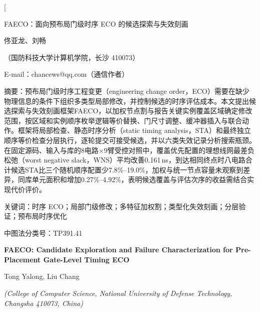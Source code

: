 \documentclass[twocolumn,10pt,fontset=windows]{ctexart}
\let\songti\songfamily\let\heiti\heifamily\let\fangsong\fangfamily
\begin{document}
\pagestyle{plain}

\twocolumn[
\vspace*{-0.25cm}
\begin{center}
{\heiti{} FAECO：面向预布局门级时序 ECO 的候选探索与失效刻画}\par
\vspace{6pt}
{\fangsong{} 佟亚龙、刘畅}\par
\vspace{4pt}
{\songti\fontsize{8}{12}\selectfont（国防科技大学计算机学院，长沙 410073）}\par\vspace{2pt}
{\songti\fontsize{8}{12}\selectfont E-mail：chancews@qq.com（通信作者）}\par
\vspace{6pt}
\end{center}
\begin{flushleft}
  {\heiti\fontsize{8.5}{13}\selectfont 摘\quad 要：}{\songti\fontsize{8.5}{13}\selectfont 预布局门级时序工程变更（engineering change order，ECO）需要在缺少物理信息的条件下组织多类型局部修改，并控制候选的时序评估成本。本文提出候选探索与失效刻画框架FAECO，以加权节点割与报告关键实例覆盖区域确定修改范围，按区域和实例顺序枚举逻辑等价替换、门尺寸调整、缓冲器插入与联合动作。框架将局部检查、静态时序分析（static timing analysis，STA）和最终独立顺序等价检查分层执行，逐轮提交可接受候选，并以六类失效记录分析搜索瓶颈。在固定源码、输入与库的8电路$\times$9臂受控对照中，覆盖优先配置的理想线网最差负松弛（worst negative slack，WNS）平均改善0.161\,ns，到达相同终点时八电路合计候选STA比三个随机顺序配置少7.8\%--19.0\%，加权与统一节点容量未观察到差异，同库单元面积和增加0.27\%--4.92\%，表明候选覆盖与评估次序的收益需结合实现代价评价。}
\par
\vspace{4pt}
{\heiti\fontsize{8.5}{13}\selectfont 关键词：}{\songti\fontsize{8.5}{13}\selectfont 时序 ECO；局部门级修改；多特征加权割；类型化失效刻画；分层验证；预布局时序优化}\par
\vspace{2pt}
{\songti\fontsize{8.5}{13}\selectfont 中图法分类号：TP391.41}\par
\vspace{3pt}
\end{flushleft}
\vspace{2pt}
\begin{center}
{\bfseries\fontsize{12.5}{16}\selectfont FAECO: Candidate Exploration and Failure Characterization for Pre-Placement Gate-Level Timing ECO}\par
\vspace{3pt}
{\normalsize Tong Yalong, Liu Chang\par}
\vspace{3pt}
{\small \itshape (College of Computer Science, National University of Defense Technology, Changsha 410073, China)}\par
\vspace{4pt}
\end{center}
\end{document}
